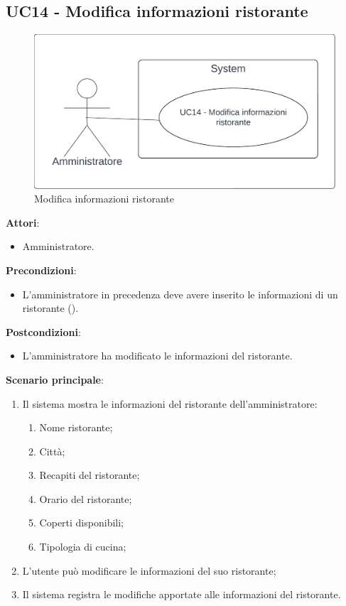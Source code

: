\subsection{UC14 - Modifica informazioni ristorante} \label{usecase:14}
\begin{figure}[H]
    \centering
    \includegraphics[width=0.9\linewidth]{ucd/ucd14.png}
    \caption{Modifica informazioni ristorante}
\end{figure}
\textbf{Attori}:
\begin{itemize}
    \item Amministratore.
\end{itemize}
\textbf{Precondizioni}:
\begin{itemize}
    \item L'amministratore in precedenza deve avere inserito le informazioni di un ristorante ().
\end{itemize}
\textbf{Postcondizioni}:
\begin{itemize}
    \item L'amministratore ha modificato le informazioni del ristorante.
\end{itemize}
\textbf{Scenario principale}:
\begin{enumerate}
    \item Il sistema mostra le informazioni del ristorante dell'amministratore:
    \begin{enumerate}
        \item Nome ristorante;
        \item Città;
        \item Recapiti del ristorante;
        \item Orario del ristorante;
        \item Coperti disponibili;
        \item Tipologia di cucina;
    \end{enumerate}
    \item L'utente può modificare le informazioni del suo ristorante;
    \item Il sistema registra le modifiche apportate alle informazioni del ristorante.
\end{enumerate}
\newpage
